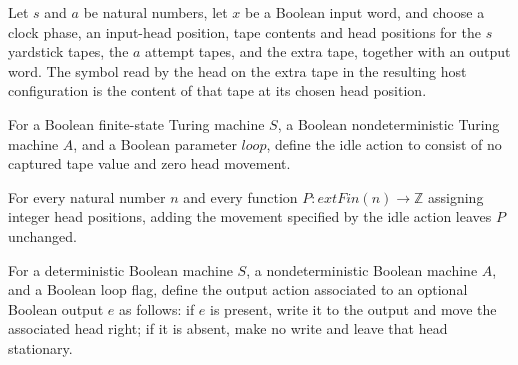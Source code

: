 \begin{theorem}
\label{Turing.ClockHost.hostCfg_symbols_yI}
\leanok
{}
Let $s$ and $a$ be natural numbers, let $x$ be a Boolean input word, and choose a clock
phase, an input-head position, tape contents and head positions for the $s$ yardstick
tapes, the $a$ attempt tapes, and the extra tape, together with an output word. The
symbol read by the head on the extra tape in the resulting host configuration is the
content of that tape at its chosen head position.
\end{theorem}

\begin{definition}
\label{Turing.ClockHost.idle}
\leanok
For a Boolean finite-state Turing machine $S$, a Boolean nondeterministic Turing machine
$A$, and a Boolean parameter $loop$, define the idle action to consist of no captured
tape value and zero head movement.
\end{definition}

\begin{theorem}
\label{Turing.ClockHost.heads_idle}
\leanok
{}
For every natural number $n$ and every function $P:	ext{Fin}(n)\to\mathbb{Z}$ assigning
integer head positions, adding the movement specified by the idle action leaves $P$
unchanged.
\end{theorem}

\begin{definition}
\label{Turing.ClockHost.emitTo}
\leanok
For a deterministic Boolean machine $S$, a nondeterministic Boolean machine $A$, and a
Boolean loop flag, define the output action associated to an optional Boolean output $e$
as follows: if $e$ is present, write it to the output and move the associated head
right; if it is absent, make no write and leave that head stationary.
\end{definition}

